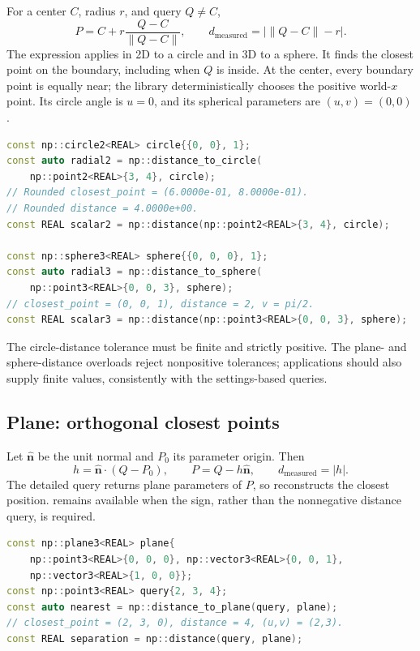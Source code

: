 For a center $C$, radius $r$, and query $Q\ne C$,
\[
 P=C+r\frac{Q-C}{\|Q-C\|},\qquad
 d_{\mathrm{measured}}=\big|\|Q-C\|-r\big|.
\]
The expression applies in 2D to a circle and in 3D to a sphere. It finds the
closest point on the boundary, including when $Q$ is inside. At the center,
every boundary point is equally near; the library deterministically chooses
the positive world-$x$ point. Its circle angle is $u=0$, and its spherical
parameters are $(u,v)=(0,0)$.
\par\noindent\begin{minipage}{\linewidth}
\begin{lstlisting}[language=C++]
const np::circle2<REAL> circle{{0, 0}, 1};
const auto radial2 = np::distance_to_circle(
    np::point2<REAL>{3, 4}, circle);
// Rounded closest_point = (6.0000e-01, 8.0000e-01).
// Rounded distance = 4.0000e+00.
const REAL scalar2 = np::distance(np::point2<REAL>{3, 4}, circle);

const np::sphere3<REAL> sphere{{0, 0, 0}, 1};
const auto radial3 = np::distance_to_sphere(
    np::point3<REAL>{0, 0, 3}, sphere);
// closest_point = (0, 0, 1), distance = 2, v = pi/2.
const REAL scalar3 = np::distance(np::point3<REAL>{0, 0, 3}, sphere);
\end{lstlisting}
\end{minipage}\par
The circle-distance tolerance must be finite and strictly positive. The
plane- and sphere-distance overloads reject nonpositive tolerances; applications
should also supply finite values, consistently with the settings-based queries.

\subsection{Plane: orthogonal closest points}

Let $\widehat{\mathbf n}$ be the unit normal and $P_0$ its parameter origin.
Then
\[
 h=\widehat{\mathbf n}\mathbin{\cdot}(Q-P_0),\qquad
 P=Q-h\widehat{\mathbf n},\qquad d_{\mathrm{measured}}=|h|.
\]
The detailed query returns plane parameters of $P$, so
 reconstructs the closest position.
 remains available when the sign, rather
than the nonnegative distance query, is required.
\par\noindent\begin{minipage}{\linewidth}
\begin{lstlisting}[language=C++]
const np::plane3<REAL> plane{
    np::point3<REAL>{0, 0, 0}, np::vector3<REAL>{0, 0, 1},
    np::vector3<REAL>{1, 0, 0}};
const np::point3<REAL> query{2, 3, 4};
const auto nearest = np::distance_to_plane(query, plane);
// closest_point = (2, 3, 0), distance = 4, (u,v) = (2,3).
const REAL separation = np::distance(query, plane);
\end{lstlisting}
\end{minipage}\par

